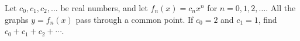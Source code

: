 Let $c_0,c_1,c_2,\dots$ be real numbers, and let $f_n(x)=c_nx^n$ for $n=0,1,2,\dots$. All the graphs $y=f_n(x)$ pass through a common point. If $c_0=2$ and $c_1=1$, find $c_0+c_1+c_2+\cdots$.
